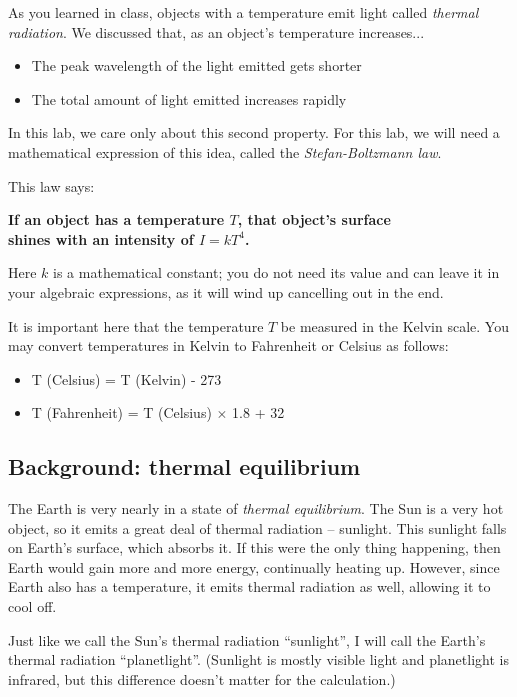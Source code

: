 \documentclass[11pt]{article}
\def\BI{\begin{itemize}}
\def\EI{\end{itemize}}
\begin{document}
As you learned in class, objects with a temperature emit light called {\it thermal radiation}. We discussed that, as an object's temperature increases...

\BI
\item The peak wavelength of the light emitted gets shorter
\item The total amount of light emitted increases rapidly
\EI

In this lab, we care only about this second property. For this lab, we will need a mathematical expression of this idea, called the {\it Stefan-Boltzmann law}.

This law says:

\begin{center}

{\bf If an object has a temperature $T$, that object's surface\\ shines with an intensity of $I=kT^4$.}

\end{center}

Here $k$ is a mathematical constant; you do not need its value and can leave it in your algebraic expressions, as it will wind up cancelling out in the end. 

It is important here that the temperature $T$ be measured in the Kelvin scale. You may convert temperatures in Kelvin to Fahrenheit or Celsius as follows:

\BI
\item T (Celsius) = T (Kelvin) - 273
\item T (Fahrenheit) = T (Celsius) $\times$ 1.8 + 32
\EI

\subsection*{Background: thermal equilibrium}

The Earth is very nearly in a state of {\it thermal equilibrium}. The Sun is a very hot object, so it emits a great deal of thermal radiation -- sunlight. 
This sunlight falls on Earth's surface, which absorbs it. If this were the only thing happening, then Earth would gain more
and more energy, continually heating up. However, since Earth also has a temperature, it emits thermal radiation as well, allowing it to cool off.  

Just like we call the Sun's thermal radiation ``sunlight'', I will call the Earth's thermal radiation ``planetlight''. (Sunlight is mostly visible light and planetlight is infrared, but this difference doesn't matter for the calculation.)
\end{document}
